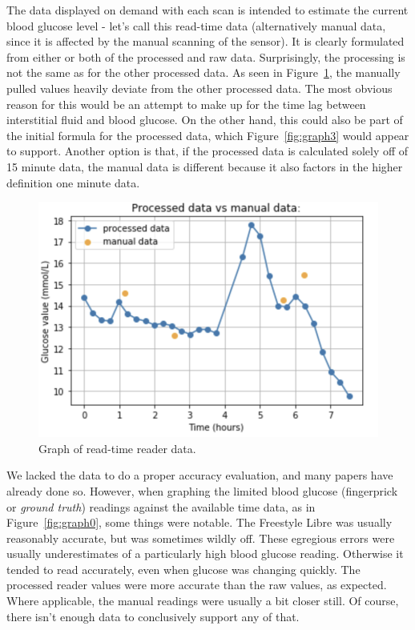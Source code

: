 The data displayed on demand with each scan is intended to estimate the current blood glucose level - let's call this read-time data (alternatively manual data, since it is affected by the manual scanning of the sensor). It is clearly formulated from either or both of the processed and raw data. Surprisingly, the processing is not the same as for the other processed data. As seen in Figure~\ref{fig:graph4}, the manually pulled values heavily deviate from the other processed data. The most obvious reason for this would be an attempt to make up for the time lag between interstitial fluid and blood glucose. On the other hand, this could also be part of the initial formula for the processed data, which Figure~\ref{fig:graph3} would appear to support. Another option is that, if the processed data is calculated solely off of 15 minute data, the manual data is different because it also factors in the higher definition one minute data. 

\begin{figure}[ht]
\centering\includegraphics[width=1.0\linewidth]{images/graph4.png}
\caption{Graph of read-time reader data.}
\label{fig:graph4}
\end{figure}

We lacked the data to do a proper accuracy evaluation, and many papers have already done so. However, when graphing the limited blood glucose (fingerprick or \textit{ground truth}) readings against the available time data, as in Figure~\ref{fig:graph0}, some things were notable. The Freestyle Libre was usually reasonably accurate, but was sometimes wildly off. These egregious errors were usually underestimates of a particularly high blood glucose reading. Otherwise it tended to read accurately, even when glucose was changing quickly. The processed reader values were more accurate than the raw values, as expected. Where applicable, the manual readings were usually a bit closer still. Of course, there isn’t enough data to conclusively support any of that.

